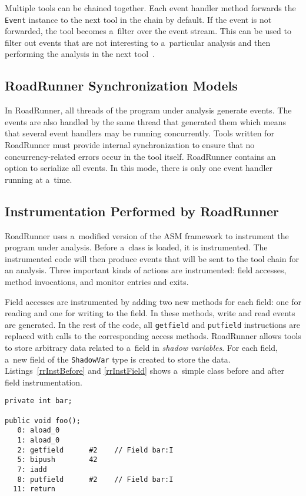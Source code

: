 Multiple tools can be chained together. Each event handler method forwards the
\texttt{Event} instance to the next tool in the chain by default. If the event
is not forwarded, the tool becomes a~filter over the event stream. This can be
used to filter out events that are not interesting to a~particular analysis and
then performing the analysis in the next tool~\cite{RoadRunner}.

\subsection{RoadRunner Synchronization Models}

In RoadRunner, all threads of the program under analysis generate events. The
events are also handled by the same thread that generated them which means that
several event handlers may be running concurrently. Tools written for RoadRunner
must provide internal synchronization to ensure that no concurrency-related
errors occur in the tool itself. RoadRunner contains an option to serialize all
events. In this mode, there is only one event handler running at a~time.

\subsection{Instrumentation Performed by RoadRunner}

RoadRunner uses a~modified version of the ASM framework to instrument the
program under analysis. Before a~class is loaded, it is instrumented. The
instrumented code will then produce events that will be sent to the tool chain
for an analysis. Three important kinds of actions are instrumented: field
accesses, method invocations, and monitor entries and exits.

Field accesses are instrumented by adding two new methods for each field: one
for reading and one for writing to the field. In these methods, write and read
events are generated. In the rest of the code, all \texttt{getfield} and
\texttt{putfield} instructions are replaced with calls to the corresponding
access methods. RoadRunner allows tools to store arbitrary data related to
a~field in \emph{shadow variables}. For each field, a~new field of the
\texttt{ShadowVar} type is created to store the data.
Listings~\ref{rrInstBefore} and \ref{rrInstField} shows a~simple class before
and after field instrumentation.

\begin{lstlisting}[label=rrInstBefore, float=h, caption={An example class
bytecode viewed using the \texttt{javap} tool, simplified.}]
private int bar;

public void foo();
   0: aload_0
   1: aload_0
   2: getfield      #2    // Field bar:I
   5: bipush        42
   7: iadd
   8: putfield      #2    // Field bar:I
  11: return\end{lstlisting}

